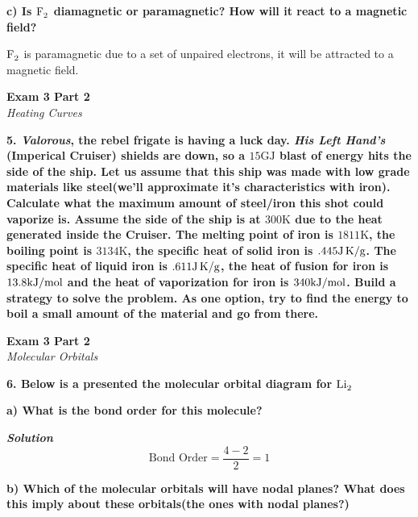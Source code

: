 \documentclass{article}
\begin{document}
    \textbf{c) Is $\ce{F2}$ diamagnetic or paramagnetic? How will it react to a magnetic field?}

    $\ce{F2}$ is paramagnetic due to a set of  unpaired electrons, it will be attracted to a magnetic field.
    \pagebreak

    \begin{center}
        \textbf{Exam 3 Part 2}\\
        \textit{Heating Curves}
    \end{center}
    \textbf{5. \textit{Valorous}, the rebel frigate is having a luck day. \textit{His Left Hand's} (Imperical Cruiser) shields are down, so a $15 \si{\giga\joule}$ blast of energy hits the side of the ship. Let us assume that this ship was made with low grade materials like steel(we'll approximate it's characteristics with iron). Calculate what the maximum amount of steel/iron this shot could vaporize is. Assume the side of the ship is at $300 \si{\kelvin}$ due to the heat generated inside the Cruiser. The melting point of iron is $1811 \si{\kelvin}$, the boiling point is $3134 \si{\kelvin}$, the specific heat of solid iron is $.445 \si[per-mode=symbol]{\joule\per\gram\kelvin}$. The specific heat of liquid iron is $.611 \si[per-mode=symbol]{\joule\per\gram\kelvin}$, the heat of fusion for iron is $13.8 \si[per-mode=symbol]{\kilo\joule\per\mole}$ and the heat of vaporization for iron is $340 \si[per-mode=symbol]{\kilo\joule\per\mole}$. Build a strategy to solve the problem. As one option, try to find the energy to boil a small amount of the material and go from there.}
    \pagebreak

    \begin{center}
        \textbf{Exam 3 Part 2}\\
        \textit{Molecular Orbitals}
    \end{center}
    \textbf{6. Below is a presented the molecular orbital diagram for $\ce{Li2}$}

    \textbf{a) What is the bond order for this molecule?}

    \textbf{\textit{Solution}}
    $$\text{Bond Order} = \dfrac{4 - 2}{2} = 1$$

    \textbf{b) Which of the molecular orbitals will have nodal planes? What does this imply about these orbitals(the ones with nodal planes?)}
\end{document}
